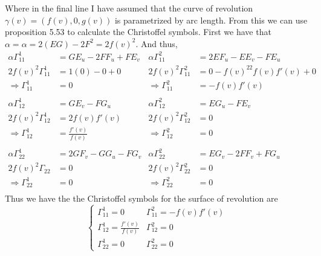 \documentclass[a4paper, 11pt]{article}
\begin{document}
\begin{enumerate}[label=\alph*]
		\noindent Where in the final line I have assumed that the curve of revolution $\gamma(v) = (f(v), 0, g(v))$ is parametrized by arc length. From this we can use proposition 5.53 to calculate the Christoffel symbols. First we have that $\alpha = \alpha = 2(EG)-2F^2 = 2f(v)^2$.  And thus, 
			\begin{align*}
				\alpha \Gamma_{11}^1&=GE_u-2FF_u +FE_v	&	\alpha\Gamma_{11}^2&= 2EF_u-EE_v-FE_u \\ 
				2f(v)^2\Gamma_{11}^1 &= 1(0)-0+0	&	2f(v)^2\Gamma_{11}^2 &= 0-f(v)^22f(v)f'(v) + 0 \\ 
				\Rightarrow \Gamma_{11}^1 &= 0	&	\Rightarrow\Gamma_{11}^2 &= -f(v)f'(v) \\ 
				\quad &&& \\ 
				\alpha\Gamma_{12}^1 &= GE_v-FG_u	&	\alpha\Gamma_{12}^2 &= EG_u-FE_v \\
				2f(v)^2\Gamma_{12}^1 &= 2f(v)f'(v)	&	2f(v)^2\Gamma_{12}^2 &= 0 \\ 
				\Rightarrow \Gamma_{12}^1 &= \frac{f'(v)}{f(v)}	&	\Rightarrow\Gamma_{12}^2 &= 0\\
				\quad&&&\\ 
				\alpha\Gamma_{22}^1 &= 2GF_v-GG_u-FG_v	&	\alpha\Gamma_{22}^2 &= EG_v-2FF_v+FG_u \\ 
				2f(v)^2\Gamma_{22}&=0	&	2f(v)^2\Gamma_{22}^2 &= 0\\ 
				\Rightarrow \Gamma_{22}^1 &= 0	&	\Rightarrow\Gamma_{22}^2 &= 0 \\ 
			\end{align*} 	
		\noindent Thus we have the the Christoffel symbols for the surface of revolution are
			\begin{equation*}
				\begin{cases}
					\Gamma_{11}^1 = 0 & \Gamma_{11}^2 = -f(v)f'(v) \\ 
					\Gamma_{12}^1 = \frac{f'(v)}{f(v)} & \Gamma_{12}^2 = 0 \\ 
					\Gamma_{22}^1 = 0 & \Gamma_{22}^2 = 0
				\end{cases}
			\end{equation*}
		

\end{enumerate}
\end{document}
